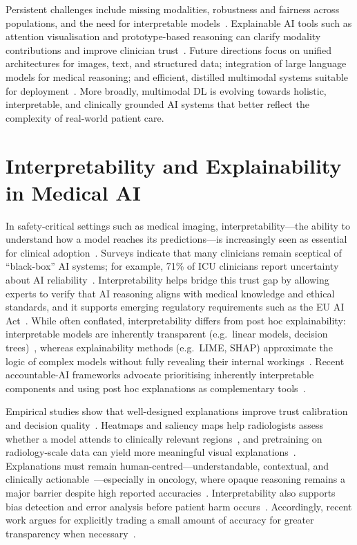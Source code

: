 Persistent challenges include missing modalities, robustness and fairness across populations, and the need for interpretable models~\cite{kline2022multimodal,YANG202229,haq2025mmml}. Explainable AI tools such as attention visualisation and prototype-based reasoning can clarify modality contributions and improve clinician trust~\cite{YANG202229,diao2025ppal}. Future directions focus on unified architectures for images, text, and structured data; integration of large language models for medical reasoning; and efficient, distilled multimodal systems suitable for deployment~\cite{zambrano2025smallmm,Vanguri2022,zhoudeep}. More broadly, multimodal DL is evolving towards holistic, interpretable, and clinically grounded AI systems that better reflect the complexity of real-world patient care.

\section{Interpretability and Explainability in Medical AI}

In safety-critical settings such as medical imaging, interpretability—the ability to understand how a model reaches its predictions—is increasingly seen as essential for clinical adoption~\cite{abgrall2024should,chen2022explainable}. Surveys indicate that many clinicians remain sceptical of “black-box” AI systems; for example, 71\% of ICU clinicians report uncertainty about AI reliability~\cite{abgrall2024should}. Interpretability helps bridge this trust gap by allowing experts to verify that AI reasoning aligns with medical knowledge and ethical standards, and it supports emerging regulatory requirements such as the EU AI Act~\cite{abgrall2024should}. While often conflated, interpretability differs from post hoc explainability: interpretable models are inherently transparent (e.g.\ linear models, decision trees)~\cite{houssein2025explainable}, whereas explainability methods (e.g.\ LIME, SHAP) approximate the logic of complex models without fully revealing their internal workings~\cite{houssein2025explainable}. Recent accountable-AI frameworks advocate prioritising inherently interpretable components and using post hoc explanations as complementary tools~\cite{singh2025beyond,napravnik2025lessons}.

Empirical studies show that well-designed explanations improve trust calibration and decision quality~\cite{chen2022explainable,vani2025personalized}. Heatmaps and saliency maps help radiologists assess whether a model attends to clinically relevant regions~\cite{vani2025personalized,napravnik2025lessons}, and pretraining on radiology-scale data can yield more meaningful visual explanations~\cite{napravnik2025lessons}. Explanations must remain human-centred—understandable, contextual, and clinically actionable~\cite{chen2022explainable}—especially in oncology, where opaque reasoning remains a major barrier despite high reported accuracies~\cite{hrinivich2023interpretable}. Interpretability also supports bias detection and error analysis before patient harm occurs~\cite{abgrall2024should}. Accordingly, recent work argues for explicitly trading a small amount of accuracy for greater transparency when necessary~\cite{singh2025beyond}.

